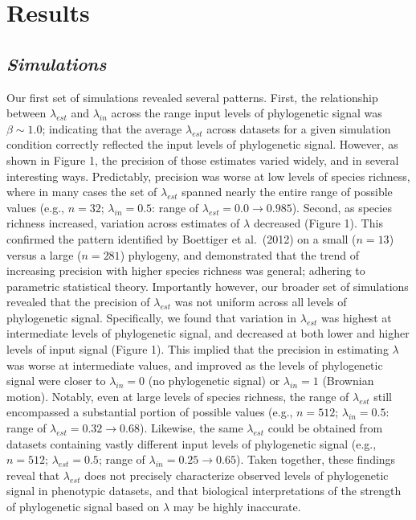 \documentclass[
]{article}
\begin{document}
\hypertarget{results}{%
\section{Results}\label{results}}

\hypertarget{simulations-1}{%
\subsection{\texorpdfstring{\emph{Simulations}}{Simulations}}\label{simulations-1}}

Our first set of simulations revealed several patterns. First, the
relationship between \(\lambda_{est}\) and \(\lambda_{in}\) across the
range input levels of phylogenetic signal was \(\beta\sim1.0\);
indicating that the average \(\lambda_{est}\) across datasets for a
given simulation condition correctly reflected the input levels of
phylogenetic signal. However, as shown in Figure 1, the precision of
those estimates varied widely, and in several interesting ways.
Predictably, precision was worse at low levels of species richness,
where in many cases the set of \(\lambda_{est}\) spanned nearly the
entire range of possible values (e.g., \(n=32\); \(\lambda_{in}=0.5\):
range of \(\lambda_{est}= 0.0\to 0.985\)). Second, as species richness
increased, variation across estimates of \(\lambda\) decreased (Figure
1). This confirmed the pattern identified by Boettiger et al.~(2012) on
a small (\(n=13\)) versus a large (\(n=281\)) phylogeny, and
demonstrated that the trend of increasing precision with higher species
richness was general; adhering to parametric statistical theory.
Importantly however, our broader set of simulations revealed that the
precision of \(\lambda_{est}\) was not uniform across all levels of
phylogenetic signal. Specifically, we found that variation in
\(\lambda_{est}\) was highest at intermediate levels of phylogenetic
signal, and decreased at both lower and higher levels of input signal
(Figure 1). This implied that the precision in estimating \(\lambda\)
was worse at intermediate values, and improved as the levels of
phylogenetic signal were closer to \(\lambda_{in}=0\) (no phylogenetic
signal) or \(\lambda_{in}=1\) (Brownian motion). Notably, even at large
levels of species richness, the range of \(\lambda_{est}\) still
encompassed a substantial portion of possible values (e.g., \(n=512\);
\(\lambda_{in}=0.5\): range of \(\lambda_{est} = 0.32\to 0.68\)).
Likewise, the same \(\lambda_{est}\) could be obtained from datasets
containing vastly different input levels of phylogenetic signal (e.g.,
\(n=512\); \(\lambda_{est} = 0.5\); range of
\(\lambda_{in} = 0.25 \to 0.65\)). Taken together, these findings reveal
that \(\lambda_{est}\) does not precisely characterize observed levels
of phylogenetic signal in phenotypic datasets, and that biological
interpretations of the strength of phylogenetic signal based on
\(\lambda\) may be highly inaccurate. \hfill\break
\end{document}
